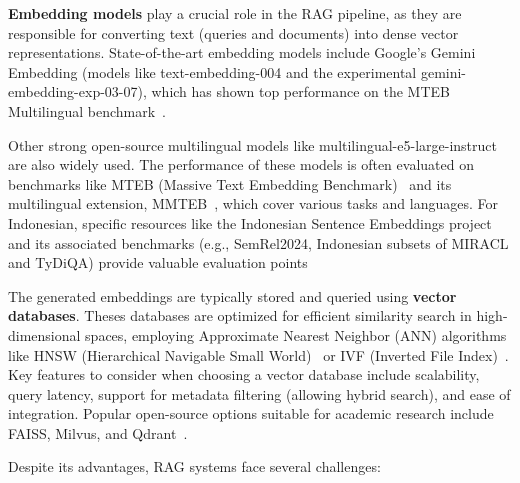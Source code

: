 \documentclass[12pt]{report}
\begin{document}
\textbf{Embedding models} play a crucial role in the RAG pipeline, as they are responsible for converting text (queries and documents) into dense vector representations. State-of-the-art embedding models include Google's Gemini Embedding (models like text-embedding-004 and the experimental gemini-embedding-exp-03-07), which has shown top performance on the MTEB Multilingual benchmark~\cite{kilpatrick2025gemini}.

Other strong open-source multilingual models like multilingual-e5-large-instruct are also widely used. The performance of these models is often evaluated on benchmarks like MTEB (Massive Text Embedding Benchmark)~\cite{muennighoff2023mtebmassivetextembedding} and its multilingual extension, MMTEB~\cite{enevoldsen2025mmtebmassivemultilingualtext}, which cover various tasks and
languages. For Indonesian, specific resources like the Indonesian Sentence Embeddings project and its associated benchmarks (e.g., SemRel2024, Indonesian subsets of MIRACL and TyDiQA) provide valuable evaluation points~\cite{wongso2024indonesian}

The generated embeddings are typically stored and queried using \textbf{vector databases}. Theses databases are optimized for efficient similarity search in high-dimensional spaces, employing Approximate Nearest Neighbor (ANN) algorithms  like HNSW (Hierarchical Navigable Small World)~\cite{malkov2018efficientrobustapproximatenearest} or IVF (Inverted File Index)~\cite{chirkin2024ivfpq}. Key features to consider when choosing a vector database include scalability, query latency, support for metadata filtering (allowing hybrid search), and ease of integration. Popular open-source options suitable for academic research include FAISS, Milvus, and Qdrant~\cite{payong2024choosing}.

Despite its advantages, RAG systems face several challenges:
\end{document}
